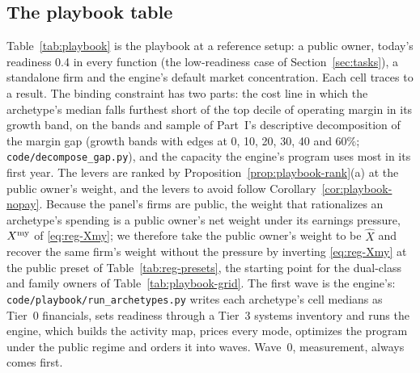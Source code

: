 \subsection{The playbook table}\label{sec:playbook-table}

Table~\ref{tab:playbook} is the playbook at a reference setup: a public owner, today's readiness 0.4 in every function (the low-readiness case of Section~\ref{sec:tasks}), a standalone firm and the engine's default market concentration. Each cell traces to a result. The binding constraint has two parts: the cost line in which the archetype's median falls furthest short of the top decile of operating margin in its growth band, on the bands and sample of Part~I's descriptive decomposition of the margin gap (growth bands with edges at 0, 10, 20, 30, 40 and 60\%; \texttt{code/decompose\_gap.py}), and the capacity the engine's program uses most in its first year. The levers are ranked by Proposition~\ref{prop:playbook-rank}(a) at the public owner's weight, and the levers to avoid follow Corollary~\ref{cor:playbook-nopay}. Because the panel's firms are public, the weight that rationalizes an archetype's spending is a public owner's net weight under its earnings pressure, $X^{\rm my}$ of \eqref{eq:reg-Xmy}; we therefore take the public owner's weight to be $\hat X$ and recover the same firm's weight without the pressure by inverting \eqref{eq:reg-Xmy} at the public preset of Table~\ref{tab:reg-presets}, the starting point for the dual-class and family owners of Table~\ref{tab:playbook-grid}. The first wave is the engine's: \texttt{code/playbook/run\_archetypes.py} writes each archetype's cell medians as Tier~0 financials, sets readiness through a Tier~3 systems inventory and runs the engine, which builds the activity map, prices every mode, optimizes the program under the public regime and orders it into waves. Wave~0, measurement, always comes first.



